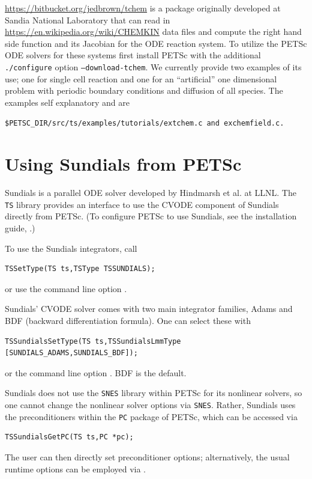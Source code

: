 \url{https://bitbucket.org/jedbrown/tchem} is a package originally developed at Sandia National Laboratory that can read in
\url{https://en.wikipedia.org/wiki/CHEMKIN} data files and compute the right hand side function and its Jacobian for the ODE reaction system.
To utilize the PETSc ODE solvers for these systems first install PETSc with the additional {\tt ./configure} 
 option {\tt --download-tchem}. We currently provide two examples of its use; one for single cell reaction and one for an ``artificial''
one dimensional problem with periodic boundary conditions and diffusion of all species. The examples self explanatory and are {\tt \$PETSC\_DIR/src/ts/examples/tutorials/extchem.c and exchemfield.c.


\section{Using Sundials from PETSc}
\label{sec_sundials}

Sundials is a parallel ODE solver developed by Hindmarsh et al. at
LLNL.  The \lstinline{TS} library provides an interface to use the
CVODE component of Sundials directly from PETSc.  (To configure PETSc
to use Sundials, see the installation
guide, .)

To use the Sundials integrators, call
\begin{lstlisting}
TSSetType(TS ts,TSType TSSUNDIALS);
\end{lstlisting}
or use the command line option  .
  

Sundials' CVODE solver comes with two main integrator families, Adams
and BDF (backward differentiation formula). One can select these with
\begin{lstlisting}
TSSundialsSetType(TS ts,TSSundialsLmmType [SUNDIALS_ADAMS,SUNDIALS_BDF]);
\end{lstlisting}
or the command line option . BDF is
the default. 
 

Sundials does not use the \lstinline{SNES} library within PETSc for its nonlinear
solvers, so one cannot change the nonlinear solver options via
\lstinline{SNES}. Rather, Sundials uses the preconditioners within the \lstinline{PC} package
of PETSc, which can be accessed via
\begin{lstlisting}
TSSundialsGetPC(TS ts,PC *pc);
\end{lstlisting}
The user can then directly set preconditioner options;
alternatively, the usual runtime options can be employed
via .

}
